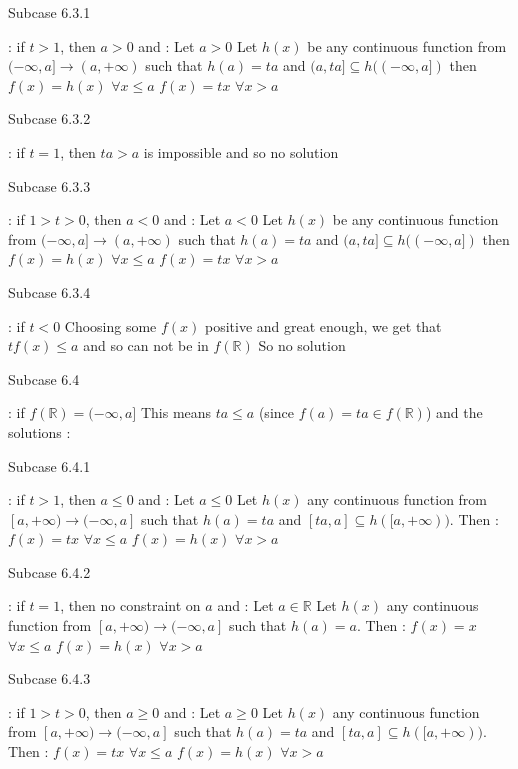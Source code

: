 \begin{solution}
\begin{tcolorbox}
\begin{bolded}Subcase 6.3.1\end{bolded} : if $t>1$, then $a>0$ and :
Let $a>0$
Let $h(x)$ be any continuous function from $(-\infty,a]\to(a,+\infty)$ such that $h(a)=ta$ and $(a,ta]\subseteq h((-\infty,a])$ then 
$f(x)=h(x)$ $\forall x\le a$
$f(x)=tx$ $\forall x>a$

\begin{bolded}Subcase 6.3.2\end{bolded} : if $t=1$, then $ta>a$ is impossible and so no solution

\begin{bolded}Subcase 6.3.3\end{bolded} : if $1>t>0$, then $a< 0$ and :
Let $a<0$
Let $h(x)$ be any continuous function from $(-\infty,a]\to(a,+\infty)$ such that $h(a)=ta$ and $(a,ta]\subseteq h((-\infty,a])$ then 
$f(x)=h(x)$ $\forall x\le a$
$f(x)=tx$ $\forall x>a$

\begin{bolded}Subcase 6.3.4\end{bolded} : if $t<0$
Choosing some $f(x)$ positive and great enough, we get that $tf(x)\le a$ and so can not be in $f(\mathbb R)$
So no solution

\begin{bolded}Subcase 6.4\end{bolded} : if $f(\mathbb R)=(-\infty,a]$
This means $ta\le a$ (since $f(a)=ta\in f(\mathbb R)$) and the solutions :

\begin{bolded}Subcase 6.4.1\end{bolded}: if $t>1$, then $a\le 0$ and :
Let $a\le 0$ 
Let $h(x)$ any continuous function from $[a,+\infty)\to(-\infty,a]$ such that $h(a)=ta$ and $[ta,a]\subseteq h([a,+\infty))$. Then :
$f(x)=tx$ $\forall x\le a$
$f(x)=h(x)$ $\forall x>a$

\begin{bolded}Subcase 6.4.2\end{bolded}: if $t=1$, then no constraint on $a$ and :
Let $a\in\mathbb R$ 
Let $h(x)$ any continuous function from $[a,+\infty)\to(-\infty,a]$ such that $h(a)=a$. Then :
$f(x)=x$ $\forall x\le a$
$f(x)=h(x)$ $\forall x>a$

\begin{bolded}Subcase 6.4.3\end{bolded} : if $1>t>0$, then $a\ge 0$ and :
Let $a\ge 0$ 
Let $h(x)$ any continuous function from $[a,+\infty)\to(-\infty,a]$ such that $h(a)=ta$ and $[ta,a]\subseteq h([a,+\infty))$. Then :
$f(x)=tx$ $\forall x\le a$
$f(x)=h(x)$ $\forall x>a$


\end{tcolorbox}
\end{solution}
